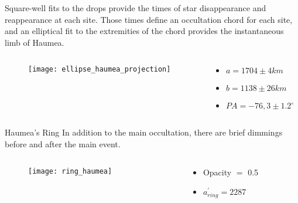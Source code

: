 \begin{frame}[c]{}
\scriptsize
\justifying
Square-well fits to the drops provide the times of star disappearance and reappearance at each site. Those times define an occultation chord for each site, and an elliptical fit to the extremities of the chord provides the instantaneous limb of Haumea.

	\begin{columns}[t]
	\begin{column}[T]{5cm}
		\begin{figure}[tb]
			\centering
			\texttt{[image: ellipse\_haumea\_projection]}
		\end{figure}
		\end{column}
	\begin{column}[T]{5cm}
	\vspace{2 cm}
	\begin{itemize}
		\item $a = 1704 \pm 4 km$
		\item $b = 1138 \pm 26 km$
		\item $PA = -76,3 \pm 1.2^{\circ}$ 
	\end{itemize}
	\end{column}
	\end{columns}

\end{frame}


\begin{frame}[t]{Haumea's Ring}
\scriptsize
\justifying
In addition to the main occultation, there are brief dimmings before and after the main event.
	\begin{columns}[t]
	\begin{column}[T]{5cm}
		\begin{figure}[tb]
			\centering
			\texttt{[image: ring\_haumea]}
		\end{figure}
	\end{column}
	\begin{column}[T]{5cm}
	\begin{itemize}
		\item Opacity $=$ 0.5
		\item $a^{'}_{ring} = 2287$
	\end{itemize}
	\end{column}
	\end{columns}
 
\end{frame}

